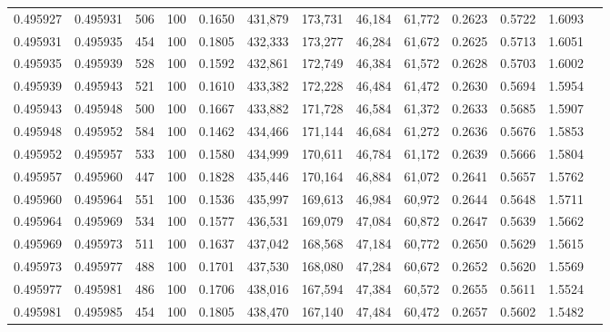 \begin{tabular}{rrrrrrrrrrrrr}
0.495927 & 0.495931 &   506 & 100 &                                     0.1650 & 431,879 & 173,731 &  46,184 &  61,772 & 0.2623 & 0.5722 & 1.6093 \\
0.495931 & 0.495935 &   454 & 100 &                                     0.1805 & 432,333 & 173,277 &  46,284 &  61,672 & 0.2625 & 0.5713 & 1.6051 \\
0.495935 & 0.495939 &   528 & 100 &                                     0.1592 & 432,861 & 172,749 &  46,384 &  61,572 & 0.2628 & 0.5703 & 1.6002 \\
0.495939 & 0.495943 &   521 & 100 &                                     0.1610 & 433,382 & 172,228 &  46,484 &  61,472 & 0.2630 & 0.5694 & 1.5954 \\
0.495943 & 0.495948 &   500 & 100 &                                     0.1667 & 433,882 & 171,728 &  46,584 &  61,372 & 0.2633 & 0.5685 & 1.5907 \\
0.495948 & 0.495952 &   584 & 100 &                                     0.1462 & 434,466 & 171,144 &  46,684 &  61,272 & 0.2636 & 0.5676 & 1.5853 \\
0.495952 & 0.495957 &   533 & 100 &                                     0.1580 & 434,999 & 170,611 &  46,784 &  61,172 & 0.2639 & 0.5666 & 1.5804 \\
0.495957 & 0.495960 &   447 & 100 &                                     0.1828 & 435,446 & 170,164 &  46,884 &  61,072 & 0.2641 & 0.5657 & 1.5762 \\
0.495960 & 0.495964 &   551 & 100 &                                     0.1536 & 435,997 & 169,613 &  46,984 &  60,972 & 0.2644 & 0.5648 & 1.5711 \\
0.495964 & 0.495969 &   534 & 100 &                                     0.1577 & 436,531 & 169,079 &  47,084 &  60,872 & 0.2647 & 0.5639 & 1.5662 \\
0.495969 & 0.495973 &   511 & 100 &                                     0.1637 & 437,042 & 168,568 &  47,184 &  60,772 & 0.2650 & 0.5629 & 1.5615 \\
0.495973 & 0.495977 &   488 & 100 &                                     0.1701 & 437,530 & 168,080 &  47,284 &  60,672 & 0.2652 & 0.5620 & 1.5569 \\
0.495977 & 0.495981 &   486 & 100 &                                     0.1706 & 438,016 & 167,594 &  47,384 &  60,572 & 0.2655 & 0.5611 & 1.5524 \\
0.495981 & 0.495985 &   454 & 100 &                                     0.1805 & 438,470 & 167,140 &  47,484 &  60,472 & 0.2657 & 0.5602 & 1.5482 \\

\end{tabular}
